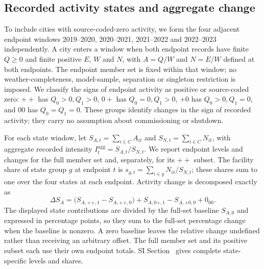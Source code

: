 \subsection{Recorded activity states and aggregate change}
To include cities with source-coded-zero activity, we form the four adjacent endpoint windows 2019--2020, 2020--2021, 2021--2022 and 2022--2023 independently.  A city enters a window when both endpoint records have finite $Q\geq0$ and finite positive $E$, $W$ and $N$, with $A=Q/W$ and $N=E/W$ defined at both endpoints.  The endpoint member set is fixed within that window; no weather-completeness, model-sample, separation or singleton restriction is imposed.  We classify the signs of endpoint activity as positive or source-coded zero: $++$ has $Q_0>0,Q_1>0$, $0+$ has $Q_0=0,Q_1>0$, $+0$ has $Q_0>0,Q_1=0$, and $00$ has $Q_0=Q_1=0$.  These groups identify changes in the sign of recorded activity; they carry no assumption about commissioning or shutdown.

For each state window, let $S_{A,t}=\sum_{i\in C}A_{it}$ and $S_{N,t}=\sum_{i\in C}N_{it}$, with aggregate recorded intensity $I^{\mathrm{agg}}_t=S_{A,t}/S_{N,t}$.  We report endpoint levels and changes for the full member set and, separately, for its $++$ subset.  The facility share of state group $g$ at endpoint $t$ is $s_{g,t}=\sum_{i\in g}N_{it}/S_{N,t}$; these shares sum to one over the four states at each endpoint.  Activity change is decomposed exactly as
\begin{equation}
\Delta S_A=\bigl(S_{A,++,1}-S_{A,++,0}\bigr)+S_{A,0+,1}-S_{A,+0,0}+0_{00}.
\label{eq:record-state-decomposition}
\end{equation}
The displayed state contributions are divided by the full-set baseline $S_{A,0}$ and expressed in percentage points, so they sum to the full-set percentage change when the baseline is nonzero.  A zero baseline leaves the relative change undefined rather than receiving an arbitrary offset.  The full member set and its positive subset each use their own endpoint totals. SI Section~ gives complete state-specific levels and shares.



